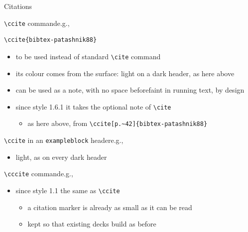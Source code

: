 \documentclass[presentation,cesena,apice]{beamer}\mode<presentation>{\usetheme{AMSCesena}}
\begin{document}
\begin{frame}{Citations}
%
\begin{block}{\texttt{\textbackslash{}ccite} command\textemdash{}e.g., }
\begin{verbatim}
\ccite{bibtex-patashnik88}
\end{verbatim}
\begin{itemize}
	\item to be used instead of standard \texttt{\textbackslash{}cite} command
	\item its colour comes from the surface: light on a dark header, as here above
	\item can be used as a note, with no space before\textemdash{}faint in running text, by design
	\item since style 1.6.1 it takes the optional note of \texttt{\textbackslash{}cite}
	\begin{itemize}
		\item as here above, from \verb|\ccite[p.~42]{bibtex-patashnik88}|
	\end{itemize}
\end{itemize}
\end{block}
%
\begin{exampleblock}{\texttt{\textbackslash{}ccite} in an \texttt{exampleblock} header\textemdash{}e.g., }
\begin{itemize}
	\item light, as on every dark header
\end{itemize}
\end{exampleblock}
%
\begin{alertblock}{\texttt{\textbackslash{}cccite} command\textemdash{}e.g., }
\begin{itemize}
	\item since style 1.1 the same as \texttt{\textbackslash{}ccite}
	\begin{itemize}
		\item a citation marker is already as small as it can be read
		\item kept so that existing decks build as before
	\end{itemize}
\end{itemize}
\end{alertblock}
%
\end{frame}
\end{document}
